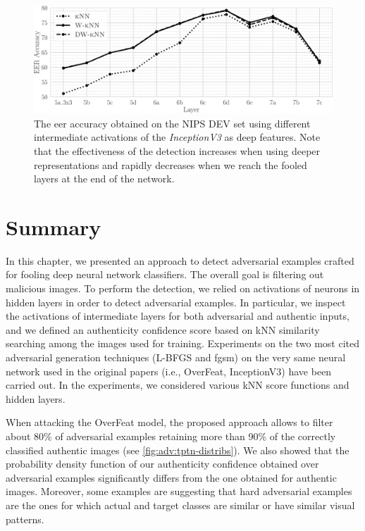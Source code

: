 \begin{figure}
\centering
\includegraphics[width=\columnwidth]{incepv3-eer-acc}
\caption{The \acrlong{eer} accuracy obtained on the NIPS DEV set using different intermediate activations of the \emph{InceptionV3} as deep features.
Note that the effectiveness of the detection increases when using deeper representations and rapidly decreases when we reach the fooled layers at the end of the network.}
\label{fig:adv:i3-eer}
\end{figure}


\section{Summary}
\label{sec:adv:conclusions}

In this chapter, we presented an approach to detect adversarial examples crafted for fooling deep neural network classifiers.
The overall goal is filtering out malicious images.
To perform the detection, we relied on activations of neurons in hidden layers in order to detect adversarial examples.
In particular, we inspect the activations of intermediate layers for both adversarial and authentic inputs, and we defined an authenticity confidence score based on kNN similarity searching among the images used for training.
Experiments on the two most cited adversarial generation techniques (L-BFGS and \gls{fgsm}) on the very same neural network used in the original papers (i.e., OverFeat, InceptionV3) have been carried out.
In the experiments, we considered various kNN score functions and hidden layers.


When attacking the OverFeat model, the proposed approach allows to filter about 80\% of adversarial examples retaining more than 90\% of the correctly classified authentic images (see \ref{fig:adv:tptn-distribs}).
We also showed that the probability density function of our authenticity confidence obtained over adversarial examples significantly differs from the one obtained for authentic images.
Moreover, some examples are suggesting that hard adversarial examples are the ones for which actual and target classes are similar or have similar visual patterns. %

